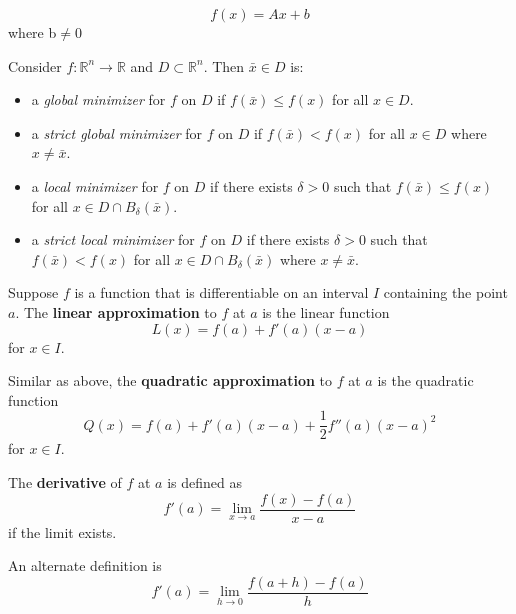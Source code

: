 \begin{definition}[affine]
\begin{equation}
    f(x) = Ax + b
\end{equation}
where b$\neq$0

\end{definition}
\begin{definition}
    Consider \(f : \mathbb{R}^n \rightarrow \mathbb{R}\) and \(D \subset \mathbb{R}^n\). Then \(\bar{x} \in D\) is:

\begin{itemize}
    \item a \textit{global minimizer} for \(f\) on \(D\) if \(f(\bar{x}) \leq f(x)\) for all \(x \in D\).
    \item a \textit{strict global minimizer} for \(f\) on \(D\) if \(f(\bar{x}) < f(x)\) for all \(x \in D\) where \(x \neq \bar{x}\).
    \item a \textit{local minimizer} for \(f\) on \(D\) if there exists \(\delta > 0\) such that \(f(\bar{x}) \leq f(x)\) for all \(x \in D \cap B_\delta(\bar{x})\).
    \item a \textit{strict local minimizer} for \(f\) on \(D\) if there exists \(\delta > 0\) such that \(f(\bar{x}) < f(x)\) for all \(x \in D \cap B_\delta(\bar{x})\) where \(x \neq \bar{x}\).
\end{itemize}
\end{definition}
\begin{definition}
    Suppose $f$ is a function that is differentiable on an interval $I$ containing the point $a$. The \textbf{linear approximation} to $f$ at $a$ is the linear function $$L(x) = f(a) + f'(a)(x-a)$$ for $x \in I$.
\end{definition}
\begin{definition}
    Similar as above, the \textbf{quadratic approximation} to $f$ at $a$ is the quadratic function $$Q(x) = f(a) + f'(a)(x-a) + \frac{1}{2}f''(a)(x-a)^2$$ for $x \in I$.
\end{definition}
\begin{definition}
    The \textbf{derivative} of $f$ at $a$ is defined as $$f'(a) = \lim_{x \rightarrow a} \frac{f(x) - f(a)}{x-a}$$ if the limit exists.

    An alternate definition is
    $$f'(a) = \lim_{h \rightarrow 0} \frac{f(a+h) - f(a)}{h}$$
\end{definition}
% 

